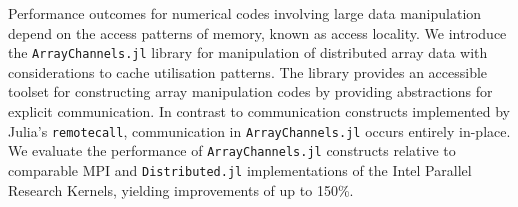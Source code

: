 Performance outcomes for numerical codes involving large data
manipulation depend on the access patterns of memory, known as access
locality. We introduce the \texttt{ArrayChannels.jl} library for
manipulation of distributed array data with considerations to cache
utilisation patterns. The library provides an accessible toolset for
constructing array manipulation codes by providing abstractions for
explicit communication. In contrast to communication constructs
implemented by Julia's \texttt{remotecall}, communication in
\texttt{ArrayChannels.jl} occurs entirely in-place. We evaluate the
performance of \texttt{ArrayChannels.jl} constructs relative to
comparable MPI and \texttt{Distributed.jl} implementations of the Intel
Parallel Research Kernels, yielding improvements of up to 150\%.
